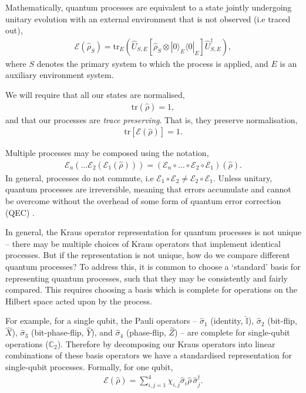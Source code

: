 \documentclass[aps,rmp,twocolumn,amsmath,amssymb,nofootinbib,superscriptaddress,longbibliography,floatfix]{revtex4-1}
\newcommand{\bra}[1]{\langle#1|}
\newcommand{\ket}[1]{|#1\rangle}
\begin{document}
Mathematically, quantum processes are equivalent to a state jointly undergoing unitary evolution with an external environment that is not observed (i.e traced out),
\begin{align} \label{eq:proc_environment}
\mathcal{E}(\hat\rho_S) = \mathrm{tr}_E (\hat{U}_{S,E} [\hat\rho_S\otimes \ket{0}_E\bra{0}_E] \hat{U}^\dag_{S,E}),
\end{align}
where $S$ denotes the primary system to which the process is applied, and $E$ is an auxiliary environment system.

We will require that all our states are normalised,
\begin{align}
\mathrm{tr}(\hat\rho) = 1,
\end{align}
and that our processes are \emph{trace preserving}. That is, they preserve normalisation,
\begin{align}
\mathrm{tr}[\mathcal{E}(\hat\rho)] = 1.
\end{align}

Multiple processes may be composed using the notation,
\begin{align}
\mathcal{E}_n(\dots \mathcal{E}_2(\mathcal{E}_1(\hat\rho)))=(\mathcal{E}_n \circ \dots \circ \mathcal{E}_2\circ\mathcal{E}_1)(\hat\rho).
\end{align}
In general, processes do not commute, i.e \mbox{$\mathcal{E}_1\circ \mathcal{E}_2 \neq \mathcal{E}_2\circ \mathcal{E}_1$}. Unless unitary, quantum processes are irreversible, meaning that errors accumulate and cannot be overcome without the overhead of some form of quantum error correction (QEC) \cite{bib:Shor95, bib:CalderbankShor96, bib:NielsenChuang00}.

In general, the Kraus operator representation for quantum processes is not unique -- there may be multiple choices of Kraus operators that implement identical processes. But if the representation is not unique, how do we compare different quantum processes? To address this, it is common to choose a `standard' basis for representing quantum processes, such that they may be consistently and fairly compared. This requires choosing a basis which is complete for operations on the Hilbert space acted upon by the process.

For example, for a single qubit, the Pauli operators -- $\hat\sigma_1$ (identity, $\mathbb{\hat{I}}$), $\hat\sigma_2$ (bit-flip, $\hat{X}$), $\hat\sigma_3$ (bit-phase-flip, $\hat{Y}$), and $\hat\sigma_4$ (phase-flip, $\hat{Z}$) -- are complete for single-qubit operations ($\mathbb{C}_2$). Therefore by decomposing our Kraus operators into linear combinations of these basis operators we have a standardised representation for single-qubit processes. Formally, for one qubit,
\begin{align} \label{eq:process_matrix}
\mathcal{E}(\hat\rho) = \sum_{i,j=1}^4 \chi_{i,j} \hat{\sigma}_i\hat\rho\,\hat{\sigma}_j^\dag.
\end{align}
\end{document}
